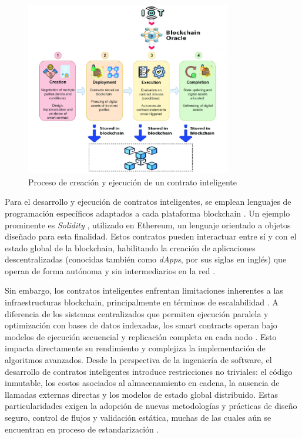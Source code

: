 \begin{figure}[!htpb]
    \centering
    \includegraphics[width=0.8\textwidth]{Figures/smart-contract-process.png}
    \caption{Proceso de creación y ejecución de un contrato inteligente}
    \label{fig:smart-contract-process}
\end{figure}

Para el desarrollo y ejecución de contratos inteligentes, se emplean lenguajes de programación específicos adaptados a cada plataforma blockchain \cite{bartolomeo2020introduccion}. Un ejemplo prominente es \textit{Solidity} \cite{taherdoost2023smart}, utilizado en Ethereum, un lenguaje orientado a objetos diseñado para esta finalidad. Estos contratos pueden interactuar entre sí y con el estado global de la blockchain, habilitando la creación de aplicaciones descentralizadas (conocidas también como \textit{dApps}, por sus siglas en inglés) que operan de forma autónoma y sin intermediarios en la red \cite{buterin2013ethereum}.

Sin embargo, los contratos inteligentes enfrentan limitaciones inherentes a las infraestructuras blockchain, principalmente en términos de escalabilidad \cite{kalajdjieski2023databases}. A diferencia de los sistemas centralizados que permiten ejecución paralela y optimización con bases de datos indexadas, los smart contracts operan bajo modelos de ejecución secuencial y replicación completa en cada nodo \cite{taherdoost2023smart}. Esto impacta directamente su rendimiento y complejiza la implementación de algoritmos avanzados. Desde la perspectiva de la ingeniería de software, el desarrollo de contratos inteligentes introduce restricciones no triviales: el código inmutable, los costos asociados al almacenamiento en cadena, la ausencia de llamadas externas directas y los modelos de estado global distribuido. Estas particularidades exigen la adopción de nuevas metodologías y prácticas de diseño seguro, control de flujos y validación estática, muchas de las cuales aún se encuentran en proceso de estandarización \cite{taherdoost2023smart, cepal2021economia}.


